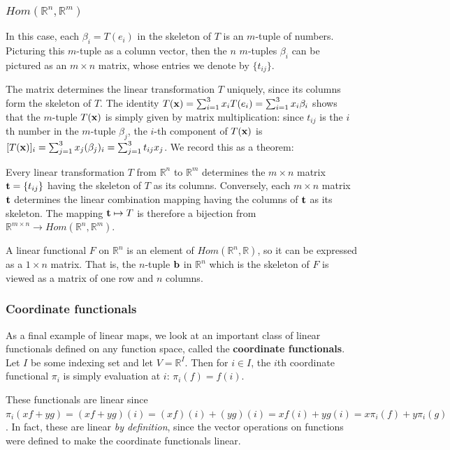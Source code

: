 \documentclass[12pt,letterpaper,reqno]{article}
\numberwithin{equation}{section}
\newcommand{\ti}[1]{\textit{#1}}
\begin{document}
\subsubsection{$Hom(\mathbb{R}^n,\mathbb{R}^m)$}
In this case, each $\beta_i=T(e_i)$ in the skeleton of $T$	is an $m$-tuple of numbers. Picturing this $m$-tuple as a column vector, then the $n$ $m$-tuples $\beta_i$ can be pictured as an $m \times n$ matrix, whose entries we denote by $\{t_{ij}\}$. 

The matrix determines the linear transformation $T$ uniquely, since its columns form the skeleton of $T$. The identity $T({\bf x})=\sum_{i=1}^3x_iT(e_i)=\sum_{i=1}^3x_i\beta_i$ shows that the $m$-tuple $T({\bf x})$ is simply given by matrix multiplication: since $t_{ij}$ is the $i$th number in the $m$-tuple $\beta_j$, the $i$-th component of $T({\bf x})$ is $[T({\bf x})]_i=\sum_{j=1}^3x_j(\beta_j)_i=\sum_{j=1}^3t_{ij}x_j$. We record this as a theorem:

\begin{thm}
Every linear transformation $T$ from $\mathbb{R}^n$ to $\mathbb{R}^m$ determines the $m \times n$ matrix ${\bf t}=\{t_{ij}\}$ having the skeleton of $T$ as its columns. Conversely, each $m \times n$ matrix ${\bf t}$ determines the linear combination mapping having the columns of ${\bf t}$ as its skeleton. The mapping ${\bf t} \mapsto T$ is therefore a bijection from $\mathbb{R}^{m \times n} \to Hom(\mathbb{R}^n,\mathbb{R}^m)$.	
\end{thm}

\begin{example}
A linear functional $F$ on $\mathbb{R}^n$ is an element of $Hom(\mathbb{R}^n,\mathbb{R})$, so it can be expressed as a $1 \times n$ matrix. That is, the $n$-tuple ${\bf b}$ in $\mathbb{R}^n$ which is the skeleton of $F$ is viewed as a matrix of one row and $n$ columns.	
\end{example}

\subsubsection{Coordinate functionals}
As a final example of linear maps, we look at an important class of linear functionals defined on any function space, called the {\bf coordinate functionals}. Let $I$ be some indexing set and let $V=\mathbb{R}^I$. Then for $i \in I$, the $i$th coordinate functional $\pi_i$ is simply evaluation at $i$: $\pi_i(f)=f(i)$.

These functionals are linear since $\pi_i(xf+yg)=(xf+yg)(i)=(xf)(i)+(yg)(i)=xf(i)+yg(i)=x\pi_i(f)+y\pi_i(g)$. In fact, these are linear \ti{by definition}, since the vector operations on functions were defined to make the coordinate functionals linear.
\end{document}
